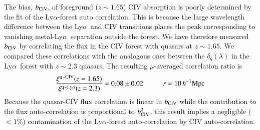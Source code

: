 \documentclass{aa}
\newcommand{\dqlam}{\delta_q(\lambda)}
\newcommand{\hMpc}{h^{-1}{\rm Mpc}}
\newcommand{\lya}{Ly$\alpha$}
\newcommand{\Lya}{Ly$\alpha$~}
\newcommand{\bciv}{b_{\rm CIV}}
\begin{document}
  The bias, $\bciv$, of foreground ($z\sim1.65$) CIV absorption
  is poorly determined by the
  fit of the \lya-forest auto correlation. This is because 
  the large wavelength difference between the \Lya and CIV
  transitions  places the peak corresponding to
  vanishing metal-\Lya separation outside the forest.
We have therefore measured $\bciv$ by
correlating the flux in the CIV forest 
with quasars at $z\sim1.65$.
We compared
these correlations with the analogous ones between the $\dqlam$
in the \Lya forest with $z\sim2.3$ quasars.
The resulting $\mu$-averaged correlation ratio is
\begin{equation}
  \frac{\xi^{\rm q-CIV}(z=1.65)}{\xi^{\rm q-Ly\alpha}(z=2.3)}
= 0.08 \pm 0.02
\hspace*{10mm} r=10\,\hMpc
\label{lyacivratio}
\end{equation}
Because the quasar-CIV flux correlation is linear in $\bciv$ while
the contribution to the flux auto-correlation is proportional
to $\bciv^2$,
this result implies a negligible ($<1\%$) contamination
of the \lya-forest auto-correlation by CIV auto-correlation.
\end{document}
